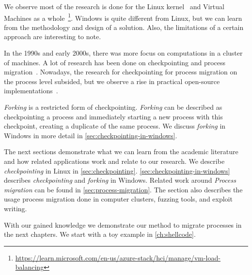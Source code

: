 \documentclass[a4paper, 11pt, english]{report}
\begin{document}
We observe most of the research is done for the Linux kernel~\cite{ansel2009dmtcp}\cite{paul2006BLCR} and Virtual Machines as a whole~\cite{park2011checkpointing-vm}\footnote{\url{https://learn.microsoft.com/en-us/azure-stack/hci/manage/vm-load-balancing}}.
Windows is quite different from Linux, but we can learn from the methodology and design of a solution. Also, the limitations of a certain approach are interesting to note.

In the 1990s and early 2000s, there was more focus on computations in a cluster of machines. A lot of research has been done on checkpointing and process migration~\cite{barak1998mosix}\cite{ousterhout1988sprite}. Nowadays, the research for checkpointing for process migration on the process level subsided, but we observe a rise in practical open-source implementations~\cite{ansel2009dmtcp}\cite{criu}.

\textit{Forking} is a restricted form of checkpointing. \textit{Forking} can be described as checkpointing a process and immediately starting a new process with this checkpoint, creating a duplicate of the same process. We discuss \textit{forking} in Windows in more detail in \autoref{sec:checkpointing-in-windows}.

The next sections demonstrate what we can learn from the academic literature and how related applications work and relate to our research. We describe \textit{checkpointing} in Linux in \autoref{sec:checkpointing}. \autoref{sec:checkpointing-in-windows} describes \textit{checkpointing} and \textit{forking} in Windows. 
Related work around \textit{Process migration} can be found in \autoref{sec:process-migration}.
The section also describes the usage process migration done in computer clusters, fuzzing tools, and exploit writing.

With our gained knowledge we demonstrate our method to migrate processes in the next chapters. We start with a toy example in \autoref{ch:shellcode}.
\end{document}
